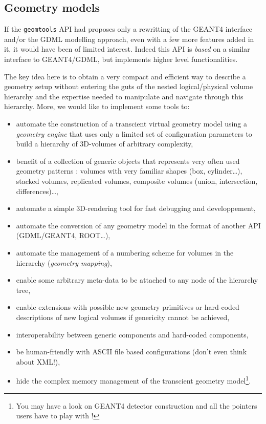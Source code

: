 \subsection{Geometry models}

\pn If the \texttt{geomtools} API had proposes only a rewritting
of the GEANT4 interface and/or the GDML modelling approach, even with a few
more features added in it, it would have been of limited interest.
Indeed this API is \emph{based} on a similar interface to GEANT4/GDML, but
implements higher level functionalities.

The key  idea here is  to obtain a  very compact and efficient  way to
describe  a geometry  setup without  entering the  guts of  the nested
logical/physical  volume   hierarchy  and  the   expertise  needed  to
manipulate and navigate through this hierarchy. More, we would like to
implement some tools to:
\begin{itemize}

\item automate the construction of a transcient virtual geometry model
  using  a \emph{geometry  engine} that  uses  only a  limited set  of
  configuration  parameters  to  build   a    hierarchy  of
  3D-volumes of arbitrary complexity,

\item benefit of a collection  of generic objects that represents very
  often  used geometry patterns  : volumes  with very  familiar shapes
  (box, cylinder\dots), stacked volumes, replicated volumes, composite
  volumes (union, intersection, differences)\dots,

\item  automate a  simple  3D-rendering tool  for  fast debugging  and
  developpement,

\item automate the  conversion of any geometry model in  the format of
  another API (GDML/GEANT4, ROOT\dots),

\item automate the management of a numbering scheme for volumes in the
  hierarchy (\emph{geometry mapping}),

\item enable some arbitrary meta-data to be attached to any node
  of the hierarchy tree,

\item  enable  extensions  with  possible new  geometry  primitives  or
  hard-coded descriptions of new  logical volumes if genericity cannot
  be achieved,

\item interoperability between generic components and hard-coded components,

\item be human-friendly with ASCII file based configurations (don't even think about XML!),

\item hide  the complex memory  management of the  transcient geometry
  model\footnote{You may  have a look on  GEANT4 detector construction
    and all the pointers users have to play with !}.

\end{itemize}


